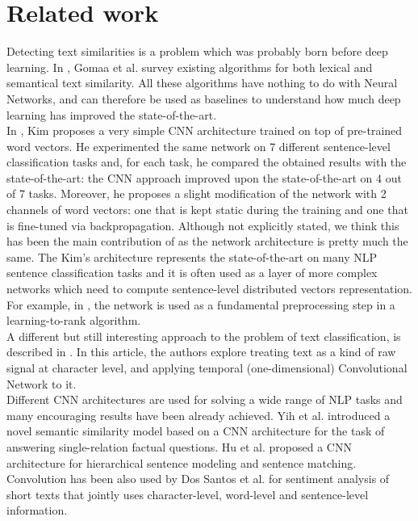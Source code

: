 \documentclass[10pt,twocolumn,letterpaper]{article}
\begin{document}
\section{Related work}
Detecting text similarities is a problem which was probably born before deep learning. In \cite{gomaa2013survey}, Gomaa et al. survey existing algorithms for both lexical and semantical text similarity. All these algorithms have nothing to do with Neural Networks, and can therefore be used as baselines to understand how much deep learning has improved the state-of-the-art.\\
In \cite{kim2014convolutional}, Kim proposes a very simple CNN architecture trained on top of pre-trained word vectors. He experimented the same network on 7 different sentence-level classification tasks and, for each task, he compared the obtained results with the state-of-the-art: the CNN approach improved upon the state-of-the-art on 4 out of 7 tasks. Moreover, he proposes a slight modification of the network with 2 channels of word vectors: one that is kept static during the training and one that is fine-tuned via backpropagation. Although not explicitly stated, we think this has been the main contribution of \cite{bogdanova2015detecting} as the network architecture is pretty much the same. The Kim's architecture represents the state-of-the-art on many NLP sentence classification tasks and it is often used as a layer of more complex networks which need to compute sentence-level distributed vectors representation. For example, in \cite{severyn2015learning}, the network is used as a fundamental preprocessing step in a learning-to-rank algorithm. \\
A different but still interesting approach to the problem of text classification, is described in \cite{zhang2015character}. In this article, the authors explore treating text as a kind of raw signal at character level, and applying temporal (one-dimensional) Convolutional Network to it.\\
Different CNN architectures are used for solving a wide range of NLP tasks and many encouraging results have been already achieved. Yih et al. \cite{yih2014semantic} introduced a novel semantic similarity model based on a CNN architecture for the task of answering single-relation factual questions. Hu et al. \cite{hu2014convolutional} proposed a CNN architecture for hierarchical sentence modeling and sentence matching. Convolution has been also used by Dos Santos et al. \cite{dos2014deep} for sentiment analysis of short texts that jointly uses character-level, word-level and sentence-level information.\\
\end{document}
